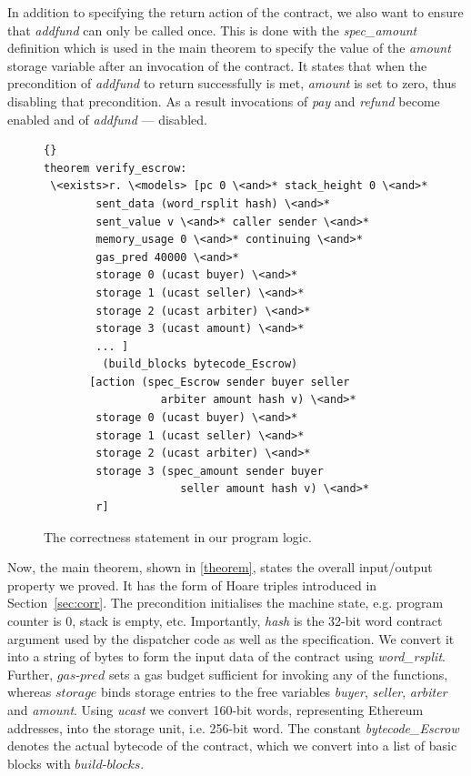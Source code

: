 \documentclass[sigplan,10pt]{acmart}\settopmatter{printfolios=true,printccs=false,printacmref=false}
\newcommand{\gaspred}{\mathit{gas\mbox{-}pred}}
\newcommand{\storage}{\mathit{storage}}
\newcommand{\bblocks}{\mathit{build\mbox{-}blocks}}
\begin{document}
In addition to specifying the return action of the contract, we also want
to ensure that \textit{addfund} can only be called once.
This is done with the \textit{spec\_amount} definition which
is used in the main theorem to specify the value of the
\textit{amount} storage variable after an invocation of the contract.
It states that when the precondition of \textit{addfund} to
return successfully is met, \textit{amount} is set to zero,
thus disabling that precondition.
As a result invocations of \textit{pay} and \textit{refund} become enabled
and of \textit{addfund} --- disabled.

\begin{figure}[h]
\begin{lstlisting}[language=Isar,keywords={[3]{hash,sender,buyer,seller,arbiter,amount,v}}]{}
theorem verify_escrow:
 \<exists>r. \<models> [pc 0 \<and>* stack_height 0 \<and>*
        sent_data (word_rsplit hash) \<and>*
        sent_value v \<and>* caller sender \<and>*
        memory_usage 0 \<and>* continuing \<and>*
        gas_pred 40000 \<and>*
        storage 0 (ucast buyer) \<and>*
        storage 1 (ucast seller) \<and>*
        storage 2 (ucast arbiter) \<and>*
        storage 3 (ucast amount) \<and>*
        ... ]
         (build_blocks bytecode_Escrow)
       [action (spec_Escrow sender buyer seller
                  arbiter amount hash v) \<and>*
        storage 0 (ucast buyer) \<and>*
        storage 1 (ucast seller) \<and>*
        storage 2 (ucast arbiter) \<and>*
        storage 3 (spec_amount sender buyer
                     seller amount hash v) \<and>*
        r]
\end{lstlisting}
\caption{The correctness statement in our program logic.}  
\label{theorem}
\end{figure}
Now, the main theorem, shown in \autoref{theorem}, states the overall input/output 
property we proved.
It has the form of Hoare triples introduced in Section~\ref{sec:corr}.
The precondition initialises the machine state, e.g. program counter is $0$,
stack is empty, etc.
Importantly, \textit{hash} is the 32-bit word contract
argument used by the dispatcher code as well as the specification.
We convert it into a string of bytes to form the input data of the contract
using \textit{word\_rsplit}.
Further, $\gaspred$ sets a gas budget sufficient for invoking any
of the functions, whereas $\storage$
binds storage entries to the free variables \textit{buyer}, \textit{seller},
\textit{arbiter} and \textit{amount}. %
Using \textit{ucast} we convert 160-bit words, representing Ethereum
addresses, into the storage unit, i.e. 256-bit word.
The constant \textit{bytecode\_Escrow} denotes
the actual bytecode of the contract,
which we convert into a list of basic blocks with $\bblocks$.
\end{document}
